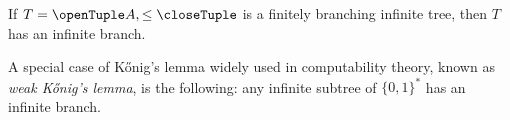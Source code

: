 \documentclass[../../../include/open-logic-section]{subfiles}
\begin{document}
\begin{prop}
If $T = \tuple{A,\le}$ is a finitely branching infinite tree,
then $T$ has an infinite branch.
\end{prop}

A special case of K\H{o}nig's lemma widely used in computability
theory, known as \emph{weak K\H{o}nig's lemma}, is the following: any
infinite subtree of $\{0,1\}^*$ has an infinite branch.
\end{document}
